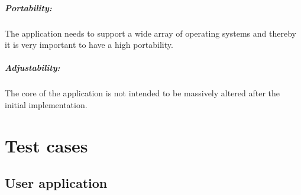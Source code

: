 \paragraph{Portability:}

The application needs to support a wide array of operating systems and thereby it is very important to have a high portability.

\paragraph{Adjustability:}

The core of the application is not intended to be massively altered after the initial implementation.  

\chapter{Test cases}

\section{User application}

